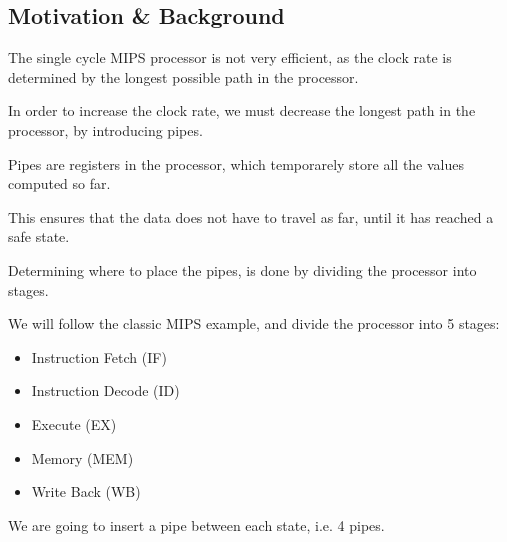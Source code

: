 \documentclass{beamer}
\begin{document}
\subsection{Motivation \& Background}
\begin{frame}
    The single cycle MIPS processor is not very efficient, as the clock rate is
    determined by the longest possible path in the processor.

    \vspace{\baselineskip}
    In order to increase the clock rate, we must decrease the longest path in
    the processor, by introducing pipes.
\end{frame}
\begin{frame}
    Pipes are registers in the processor, which temporarely store all the
    values computed so far.

    \vspace{\baselineskip}
    This ensures that the data does not have to travel as far, until it has
    reached a safe state.
\end{frame}
\begin{frame}
    Determining where to place the pipes, is done by dividing the processor
    into stages.

    \vspace{\baselineskip}
    We will follow the classic MIPS example, and divide the processor into 5
    stages:
    \begin{itemize}
        \item Instruction Fetch (IF)
        \item Instruction Decode (ID)
        \item Execute (EX)
        \item Memory (MEM)
        \item Write Back (WB)
    \end{itemize}
    We are going to insert a pipe between each state, i.e. 4 pipes.
\end{frame}
\end{document}
